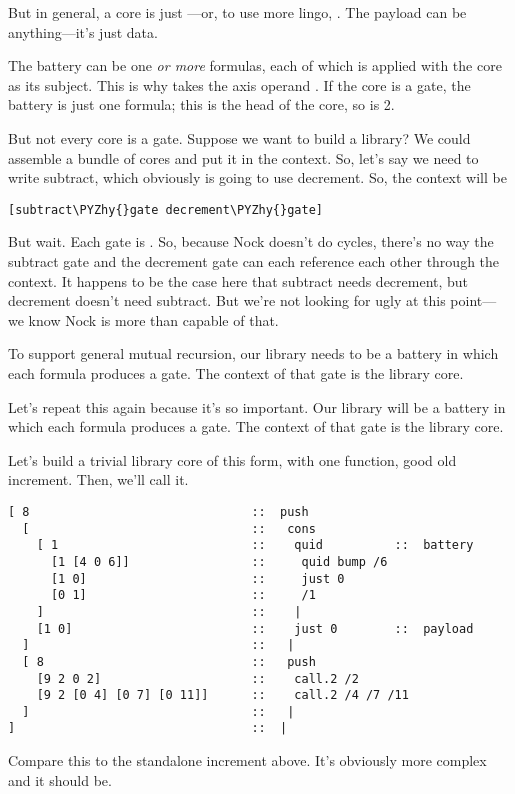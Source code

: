 But in general, a core is just ---or, to use more
lingo, .  The payload can be anything---it's
just data.

The battery can be one \emph{or more} formulas, each of which is
applied with the core as its subject.  This is why  takes the
axis operand .  If the core is a gate, the battery is just one
formula; this is the head of the core, so  is 2.

But not every core is a gate.  Suppose we want to build a
library?  We could assemble a bundle of cores and put it in
the context.  So, let's say we need to write subtract, which
obviously is going to use decrement.  So, the context will be

\begin{framed_shaded}
\begin{Verbatim}[fontsize=\relsize{-2.5},fontseries=b,commandchars=\\\{\}]
[subtract\PYZhy{}gate decrement\PYZhy{}gate]
\end{Verbatim}
\end{framed_shaded}
But wait.  Each gate is .  So, because
Nock doesn't do cycles, there's no way the subtract gate and the
decrement gate can each reference each other through the context.
It happens to be the case here that subtract needs decrement, but
decrement doesn't need subtract.  But we're not looking for ugly
at this point---we know Nock is more than capable of that.

To support general mutual recursion, our library needs to be a
battery in which each formula produces a gate.  The context of
that gate is the library core.

Let's repeat this again because it's so important.  Our library
will be a battery in which each formula produces a gate.  The
context of that gate is the library core.

Let's build a trivial library core of this form, with one
function, good old increment.  Then, we'll call it.

\begin{framed_shaded}
\begin{Verbatim}[fontsize=\relsize{-2.5},fontseries=b,commandchars=\\\{\}]
[ 8                               ::  push
  [                               ::   cons
    [ 1                           ::    quid          ::  battery
      [1 [4 0 6]]                 ::     quid bump /6
      [1 0]                       ::     just 0
      [0 1]                       ::     /1
    ]                             ::    |
    [1 0]                         ::    just 0        ::  payload
  ]                               ::   |
  [ 8                             ::   push
    [9 2 0 2]                     ::    call.2 /2
    [9 2 [0 4] [0 7] [0 11]]      ::    call.2 /4 /7 /11
  ]                               ::   |
]                                 ::  |
\end{Verbatim}
\end{framed_shaded}
Compare this to the standalone increment above.  It's obviously
more complex and it should be.

